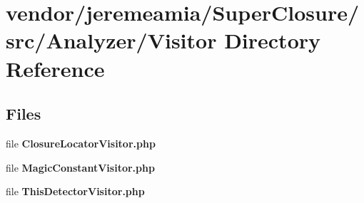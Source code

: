 \section{vendor/jeremeamia/\+Super\+Closure/src/\+Analyzer/\+Visitor Directory Reference}
\label{dir_45d96be5e57910722172a5595ccf74e5}
\subsection*{Files}
\begin{DoxyCompactItemize}
\item 
file {\bf Closure\+Locator\+Visitor.\+php}
\item 
file {\bf Magic\+Constant\+Visitor.\+php}
\item 
file {\bf This\+Detector\+Visitor.\+php}
\end{DoxyCompactItemize}
